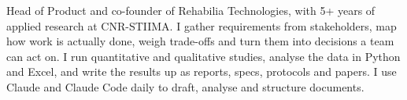 {Head of Product and co-founder of Rehabilia Technologies, with 5+ years of applied research at CNR-STIIMA. I gather requirements from stakeholders, map how work is actually done, weigh trade-offs and turn them into decisions a team can act on. I run quantitative and qualitative studies, analyse the data in Python and Excel, and write the results up as reports, specs, protocols and papers. I use Claude and Claude Code daily to draft, analyse and structure documents.}
